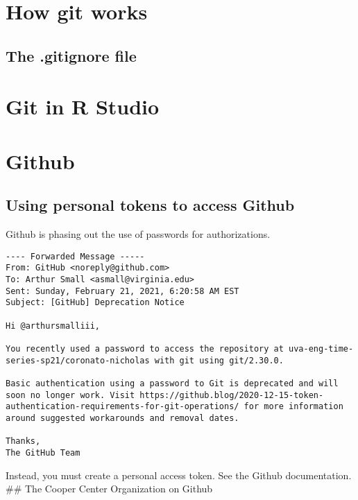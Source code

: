 \documentclass[
]{book}
\begin{document}
\hypertarget{how-git-works}{%
\section{How git works}\label{how-git-works}}

\hypertarget{the-.gitignore-file}{%
\subsection{The .gitignore file}\label{the-.gitignore-file}}

\hypertarget{git-in-r-studio}{%
\section{Git in R Studio}\label{git-in-r-studio}}

\hypertarget{github}{%
\section{Github}\label{github}}

\hypertarget{using-personal-tokens-to-access-github}{%
\subsection{Using personal tokens to access Github}\label{using-personal-tokens-to-access-github}}

Github is phasing out the use of passwords for authorizations.

\begin{verbatim}
---- Forwarded Message -----
From: GitHub <noreply@github.com>
To: Arthur Small <asmall@virginia.edu>
Sent: Sunday, February 21, 2021, 6:20:58 AM EST
Subject: [GitHub] Deprecation Notice

Hi @arthursmalliii,

You recently used a password to access the repository at uva-eng-time-series-sp21/coronato-nicholas with git using git/2.30.0.

Basic authentication using a password to Git is deprecated and will soon no longer work. Visit https://github.blog/2020-12-15-token-authentication-requirements-for-git-operations/ for more information around suggested workarounds and removal dates.

Thanks,
The GitHub Team
\end{verbatim}

Instead, you must create a personal access token. See the Github documentation.
\#\# The Cooper Center Organization on Github
\end{document}
